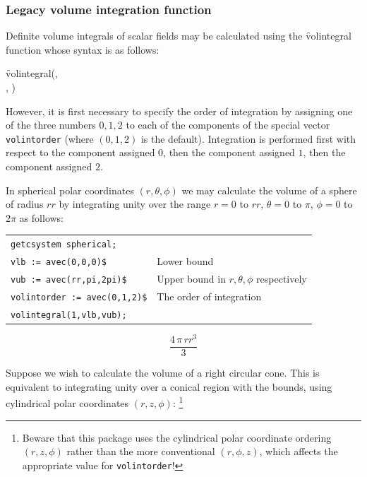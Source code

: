\subsubsection{Legacy volume integration function}

\hypertarget{operator:VOLINTEGRAL}{}
Definite volume integrals of scalar fields may be calculated using
the \f{volintegral} function whose syntax is as follows:
\begin{syntax}
  \f{volintegral}(,\\
  , )
\end{syntax}
%
\hypertarget{reserved:VOLINTORDER}{}%
However, it is first necessary to specify the order of integration by
assigning one of the three numbers $0,1,2$ to each of the components
of the special vector \texttt{volintorder} (where $(0,1,2)$ is the
default).  Integration is performed first with respect to the
component assigned $0$, then the component assigned $1$, then the
component assigned $2$.

\example{}

In spherical polar coordinates $(r,\theta,\phi)$ we may calculate the
volume of a sphere of radius $\mathit{rr}$ by integrating unity over
the range $r=0$ to $\mathit{rr}$, $\theta=0$ to $\pi$, $\phi=0$ to
$2\pi$ as follows:

\begin{tabular}{l|l}
\multicolumn{1}{l}{\texttt{getcsystem spherical;}} \\
\texttt{vlb := avec(0,0,0)\$} & Lower bound \\
\texttt{vub := avec(rr,pi,2pi)\$} & Upper bound in $r, \theta, \phi$
 respectively \\
\texttt{volintorder := avec(0,1,2)\$} & The order of integration \\
\multicolumn{1}{l}{\texttt{volintegral(1,vlb,vub);}}
\end{tabular}
\[ \frac{4\,\pi\,rr^3}{3} \]

\example{}

Suppose we wish to calculate the volume of a right circular cone. This
is equivalent to integrating unity over a conical region with the
bounds, using cylindrical polar coordinates $(r,z,\phi)$:%
\footnote{Beware that this package uses the cylindrical polar
coordinate ordering $(r,z,\phi)$ rather than the more conventional
$(r,\phi,z)$, which affects the appropriate value
for \texttt{volintorder}!}

